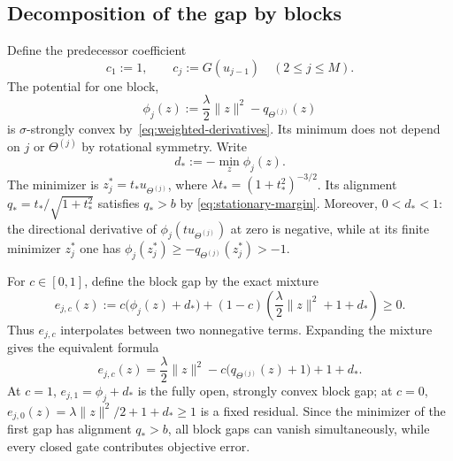 \documentclass{article}
\theoremstyle{definition}
\begin{document}
\subsection{Decomposition of the gap by blocks}

Define the predecessor coefficient
\begin{equation}
 c_1:=1,
 \qquad
 c_j:=G(u_{j-1})\quad(2\le j\le M).
 \label{eq:weighted-predecessor-coefficient}
\end{equation}
The potential for one block,
\begin{equation}
 \phi_j(z):=\frac\lambda2\|z\|^2-q_{\Theta^{(j)}}(z)
 \label{eq:weighted-unit-block}
\end{equation}
is $\sigma$-strongly convex by~\eqref{eq:weighted-derivatives}.  Its minimum
does not depend on $j$ or $\Theta^{(j)}$ by rotational symmetry.  Write
\begin{equation}
 d_*:=-\min_z\phi_j(z).
 \label{eq:weighted-unit-depth}
\end{equation}
The minimizer is $z_j^*=t_*u_{\Theta^{(j)}}$, where
$\lambda t_*=(1+t_*^2)^{-3/2}$.  Its alignment
$q_*=t_*/\sqrt{1+t_*^2}$ satisfies $q_*>b$ by
\eqref{eq:stationary-margin}.  Moreover, $0<d_*<1$: the directional derivative
of $\phi_j(tu_{\Theta^{(j)}})$ at zero is negative, while at its finite minimizer
$z_j^*$ one has
$\phi_j(z_j^*)\ge-q_{\Theta^{(j)}}(z_j^*)>-1$.

For $c\in[0,1]$, define the block gap by the exact mixture
\begin{equation}
 e_{j,c}(z)
 :=c\bigl(\phi_j(z)+d_*\bigr)
 +(1-c)\left(\frac\lambda2\|z\|^2+1+d_*\right)
 \ge0.
 \label{eq:weighted-block-gap-mixture}
\end{equation}
Thus $e_{j,c}$ interpolates between two nonnegative terms.  Expanding
the mixture gives the equivalent formula
\begin{equation}
 e_{j,c}(z)
 =\frac\lambda2\|z\|^2-c\bigl(q_{\Theta^{(j)}}(z)+1\bigr)+1+d_*.
 \label{eq:weighted-block-gap-definition}
\end{equation}
At $c=1$, $e_{j,1}=\phi_j+d_*$ is the fully open, strongly convex block gap;
at $c=0$, $e_{j,0}(z)=\lambda\|z\|^2/2+1+d_*\ge1$ is a fixed residual.  Since
the minimizer of the first gap has alignment $q_*>b$, all block gaps can vanish
simultaneously, while every closed gate contributes objective error.
\end{document}
